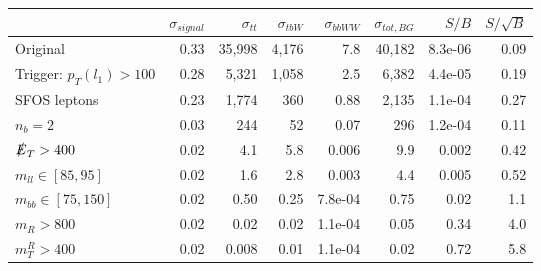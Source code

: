 \begin{tabular}{lrrrrrrr}
\toprule
{} &  $\sigma_{signal}$     &  $\sigma_{tt}$     &  $\sigma_{tbW}$ &  $\sigma_{bbWW}$ &  $\sigma_{tot, BG}$ &   $S/B$ &  $S/\sqrt{B}$ \\
\midrule
Original                    &               0.33 &         35,998 &           4,176 &              7.8 &             40,182 & 8.3e-06 &          0.09 \\
Trigger: $p_T(l_1) > 100$   &               0.28 &          5,321 &           1,058 &              2.5 &              6,382 & 4.4e-05 &          0.19 \\
SFOS leptons       &               0.23 &          1,774 &             360 &             0.88 &              2,135 & 1.1e-04 &          0.27 \\
$n_b = 2$                   &               0.03 &            244 &              52 &             0.07 &                296 & 1.2e-04 &          0.11 \\
$\slashed{E}_T > 400$       &               0.02 &            4.1 &             5.8 &            0.006 &                9.9 &   0.002 &          0.42 \\
$m_{ll} \in [85,95]$        &               0.02 &            1.6 &             2.8 &            0.003 &                4.4 &   0.005 &          0.52 \\
$m_{bb} \in [75,150]$       &               0.02 &           0.50 &            0.25 &          7.8e-04 &               0.75 &    0.02 &           1.1 \\
$m_{R} > 800$               &               0.02 &           0.02 &            0.02 &          1.1e-04 &               0.05 &    0.34 &           4.0 \\
$m_{T}^{R} > 400$           &               0.02 &          0.008 &            0.01 &          1.1e-04 &               0.02 &    0.72 &           5.8 \\
\bottomrule
\end{tabular}
